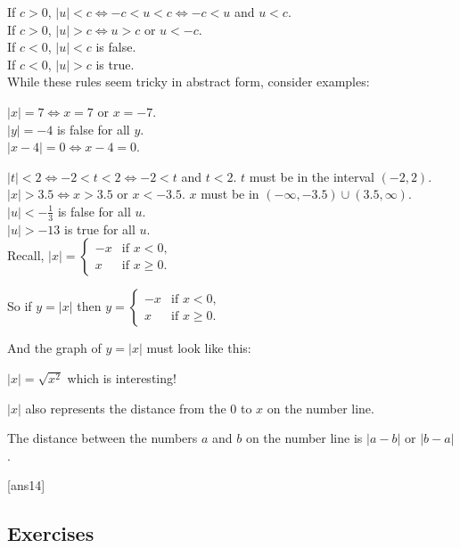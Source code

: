 \documentclass{amsbook}
\numberwithin{section}{chapter}
\numberwithin{equation}{chapter}
\newcommand{\drawgridxxyy}[4]{
	\draw[thin, color=lightgray] (#1,#3) grid (#2,#4);
	\draw[thick,->] (#1,0) -- (#2,0) node[right] {$x$}; 
	\draw[thick, ->] (0,#3) -- (0,#4) node[above] {$y$};
}
\newcommand{\ds}{\displaystyle}
\begin{document}
If $c > 0$, $|u| < c \iff -c < u < c \iff -c < u$ and $u < c$.\\
If $c > 0$, $|u| > c \iff u > c$ or $u < -c$. \\
If $c < 0$, $|u| < c$ is false.\\
If $c < 0$, $|u| > c$ is true.\\

While these rules seem tricky in abstract form, consider examples:

$|x| = 7 \iff x=7$ or $x=-7$.\\
$|y| = -4$ is false for all $y$.\\
$|x-4|=0 \iff x-4=0$.

$|t| < 2 \iff -2 < t < 2 \iff -2 < t$ and $t < 2$. $t$ must be in the interval $(-2,2)$.\\
$|x| > 3.5 \iff x > 3.5$ or $x < -3.5$. $x$ must be in $(-\infty, -3.5)\cup (3.5,\infty)$.\\
$|u| < -\frac{1}{3}$ is false for all $u$.\\
$|u| > -13$ is true for all $u$.\\

Recall, $\ds{|x| = \begin{cases} 
	-x & \text{if } x< 0, \\
	x & \text{if } x \geq 0. 
	\end{cases}  }$

So if $y=|x|$ then $y= \begin{cases} 
-x & \text{if } x< 0, \\
x & \text{if } x \geq 0. 
\end{cases}$

And the graph of $y=|x|$ must look like this:\\

$|x| = \sqrt{x^2}$ which is interesting!

$|x|$ also represents the distance from the 0 to $x$ on the number line.

The distance between the numbers $a$ and $b$ on the number line is $|a-b|$ or $|b-a|$.



[ans14]
\subsection*{Exercises \nopunct} \hfill
\end{document}
